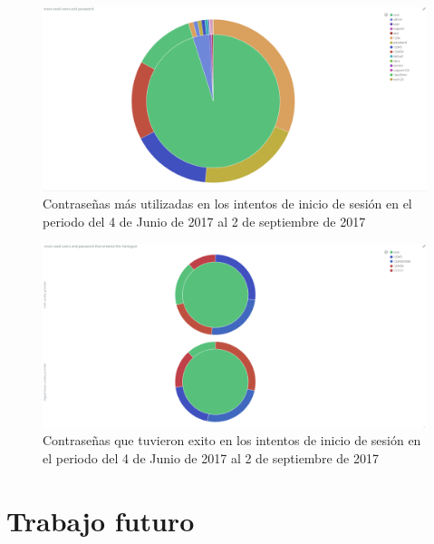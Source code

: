   \begin{figure}[h]
    \centering
      \includegraphics[scale=0.3]{images/ElasticPiePasswors}
    \caption{Contraseñas más utilizadas en los intentos de inicio de sesión en el periodo del 4 de Junio de 2017 al 2 de septiembre de 2017}
    \label{fig:data-pie-passwords}
  \end{figure}

  \begin{figure}[h]
    \centering
      \includegraphics[scale=0.3]{images/ElasticPiePasswordSuccessful}
    \caption{Contraseñas que tuvieron exito en los intentos de inicio de sesión en el periodo del 4 de Junio de 2017 al 2 de septiembre de 2017}
    \label{fig:data-pie-passwords}
  \end{figure}
  
  
  
\section{Trabajo futuro}


